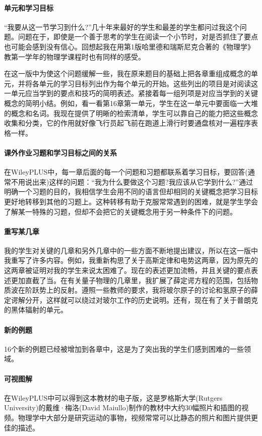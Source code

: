 \paragraph{单元和学习目标}“我要从这一节学习到什么?”几十年来最好的学生和最差的学生都问过我这个问题。问题在于，即使是一个善于思考的学生在阅读一个小节时，对是否抓住了要点也可能会感到没有信心。回想起我在用第1版哈里德和瑞斯尼克合著的《物理学》教第一学年的物理学课程时也有同样的感受。

在这一版中为使这个问题缓解一些，我在原来题目的基础上把各章重组成概念的单元，并将各单元的学习目标列出作为每个单元的开始。这些列出的项目是对阅读这一单元应当学到的要点和技巧的简明表述。紧接着每一组列项是对应当学到的关键概念的简明小结。例如，看一看第16章第一单元，学生在这一单元中要面临一大堆的概念和名词。我现在提供了明晰的检索清单，学生可以靠自己的能力把这些概念收集和分类，它的作用就好像飞行员起飞前在跑道上滑行时要通盘核对一遍程序表格一样。

\paragraph{课外作业习题和学习目标之间的关系}
在WileyPLUS中，每一章后面的每一个问题和习题都联系着学习目标，要回答(通常不用说出来)这样的问题：“我为什么要做这个习题?我应该从它学到什么?”通过明确一个习题的目的，我相信学生会用不同的语言但却相同的关键概念把学习目标更好地转移到其他的习题上。这种转移有助于克服常常遇到的困难，就是学生学会了解某一特殊的习题，但却不会把它的关键概念用于另一种条件下的问题。

\paragraph{重写某几章}我的学生对关键的几章和另外几章中的一些方面不断地提出建议，所以在这一版中我重写了许多内容。例如，我重新构思了关于高斯定律和电势这两章，因为原先的这两章被证明对我的学生来说太困难了。现在的表述更加流畅，并且关键的要点表述更加直截了当。在有关量子物理的几章里，我扩展了薛定谔方程的范围，包括物质波在阶跃势上的反射。遵照一些教师的要求，我将玻尔原子的讨论和氢原子的薛定谔解分开，这样就可以绕过对玻尔工作的历史说明。还有，现在有了关于普朗克的黑体辐射的单元。

\paragraph{新的例题}16个新的例题已经被增加到各章中，这是为了突出我的学生们感到困难的一些领域。

\paragraph{可视图解}在WileyPLUS中可以得到这本教材的电子版，这是罗格斯大学(Rutgers University)的戴维·梅洛(David Maiullo)制作的教材中大约30幅照片和插图的视频。物理学中大部分是研究运动的事物，视频常常可以比静态的照片和图片提供更佳的描述。

